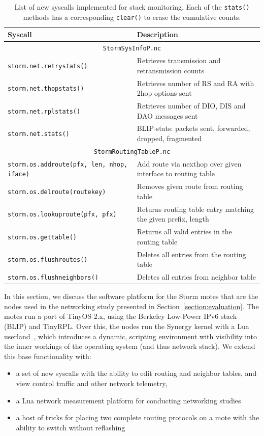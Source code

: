 \begin{table}[ht!]
\centering
\begin{tabular}{| l | l |}
\hline
\textbf{Syscall} & \textbf{Description} \\ \hline \hline
\multicolumn{2}{|c|}{\texttt{StormSysInfoP.nc}} \\ \hline
\verb`storm.net.retrystats()` & Retrieves transmission and retransmission counts \\ \hline
\verb`storm.net.thopstats()` & Retrieves number of RS and RA with 2hop options sent \\ \hline
\verb`storm.net.rplstats()` & Retrieves number of DIO, DIS and DAO messages sent \\ \hline
\verb`storm.net.stats()` & BLIP-stats: packets sent, forwarded, dropped, fragmented \\ \hline
\multicolumn{2}{|c|}{\texttt{StormRoutingTableP.nc}} \\ \hline
\verb`storm.os.addroute(pfx, len, nhop, iface)` & Add route via nexthop over given interface to routing table \\ \hline
\verb`storm.os.delroute(routekey)` & Removes given route from routing table \\ \hline
\verb`storm.os.lookuproute(pfx, pfx)` & Returns routing table entry matching the given prefix, length \\ \hline
\verb`storm.os.gettable()` & Returns all valid entries in the routing table \\ \hline
\verb`storm.os.flushroutes()` & Deletes all entries from the routing table \\ \hline
\verb`storm.os.flushneighbors()` & Deletes all entries from neighbor table \\ \hline
\end{tabular}
\caption{List of new syscalls implemented for stack monitoring. Each of the \texttt{stats()} methods has a corresponding \texttt{clear()} to erase the cumulative counts.}
\label{table:syscalls}
\end{table}

In this section, we discuss the software platform for the Storm motes that are the nodes used in the networking study presented in Section~\ref{section:evaluation}.
The motes run a port of TinyOS 2.x, using the Berkeley Low-Power IPv6 stack (BLIP) and TinyRPL.
Over this, the nodes run the Synergy kernel with a Lua userland~\cite{andersen2016system}, which introduces a dynamic, scripting environment with visibility into the inner workings of the operating system (and thus network stack).
We extend this base functionality with:
\begin{itemize}
\item a set of new syscalls with the ability to edit routing and neighbor tables, and view control traffic and other network telemetry,
\item a Lua network measurement platform for conducting networking studies
\item a host of tricks for placing two complete routing protocols on a mote with the ability to switch without reflashing
\end{itemize}

